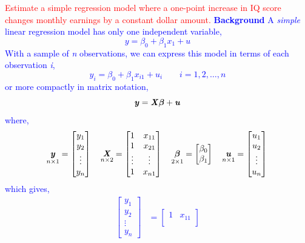 \documentclass[12pt]{report}
\newenvironment{blueframed}[1][blue]
{\def\FrameCommand{\fboxsep=\FrameSep\fcolorbox{#1}{white}}%
\MakeFramed {\advance\hsize-\width \FrameRestore}}
{\endMakeFramed}
\begin{document}
\noindent \textcolor{red}{Estimate a simple regression model where a one-point increase in IQ score changes monthly earnings by a constant dollar amount.}
\justify
\begin{blueframed}
	\textcolor{blue}{\textbf{Background}}
	\vspace{-\baselineskip}
	\justify
	\textcolor{blue}{A \textit{simple} linear regression model has only one independent variable,
	$$y = \beta_0+\beta_1x_{1}+u$$
	With a sample of \textit{n} observations, we can express this model in terms of each observation \textit{i},
	$$y_i = \beta_0+\beta_1x_{i1}+u_i \qquad i=1,2,\dots,n$$ 
	}
\end{blueframed}
\begin{blueframed}
	\noindent \textcolor{blue}
	{
	or more compactly in matrix notation,
	$$\textbf{\textit{y}}=\textbf{\textit{X}}\boldsymbol{\beta}+\textbf{\textit{u}}$$
	where,
	$$
	\underset{n\times1}{\textbf{\textit{y}}}
	=
	\begin{bmatrix}
	y_{1} \\
	y_{2} \\
	\vdots \\
	y_{n} 
	\end{bmatrix}
	\quad
	\underset{n\times2}{\textbf{\textit{X}}}
	=
	\begin{bmatrix}
	1 & x_{11} \\
	1 & x_{21} \\
	\vdots & \vdots \\
	1 & x_{n1}  
	\end{bmatrix}
	\quad
	\underset{2\times1}{\boldsymbol{\beta}} =
	\begin{bmatrix}
	\beta_0 \\
	\beta_1 
	\end{bmatrix} 
	\quad
	\underset{n\times1}{\textbf{\textit{u}}}
	=
	\begin{bmatrix}
	u_{1} \\
	u_{2} \\
	\vdots \\
	u_{n} 
	\end{bmatrix} \\
	$$
	which gives,
	\begin{align*}
	\begin{bmatrix}
		y_{1} \\
		y_{2} \\
		\vdots \\
		y_{n} 
	\end{bmatrix}
	&=
	\begin{bmatrix}
	1 & x_{11} \\

\end{bmatrix}
\end{align*}}
\end{blueframed}
\end{document}
